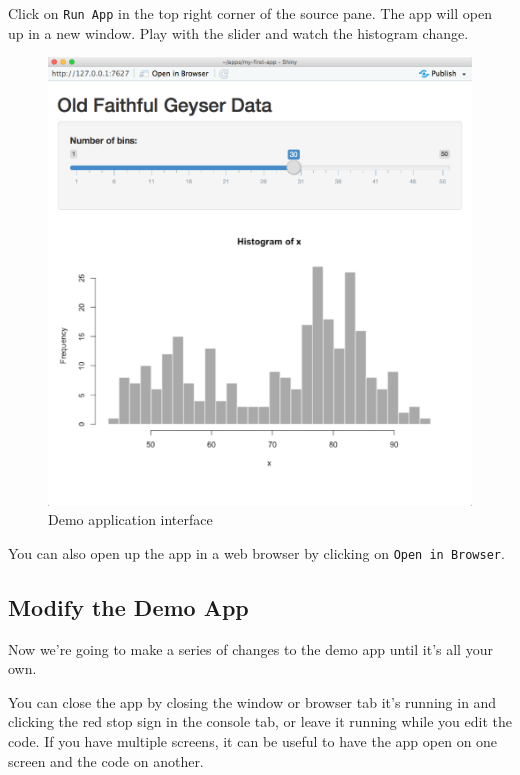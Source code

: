 \documentclass[
]{book}
\begin{document}
Click on \texttt{Run\ App} in the top right corner of the source pane. The app will open up in a new window. Play with the slider and watch the histogram change.

\begin{figure}

{\centering \includegraphics[width=1\linewidth]{images/demo_app/05-app-interface} 

}

\caption{Demo application interface}\label{fig:first-app-interface}
\end{figure}

You can also open up the app in a web browser by clicking on \texttt{Open\ in\ Browser}.

\hypertarget{modify-the-demo-app}{%
\subsection{Modify the Demo App}\label{modify-the-demo-app}}

Now we're going to make a series of changes to the demo app until it's all your own.

You can close the app by closing the window or browser tab it's running in and clicking the red stop sign in the console tab, or leave it running while you edit the code. If you have multiple screens, it can be useful to have the app open on one screen and the code on another.
\end{document}
